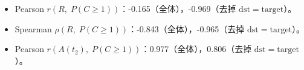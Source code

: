 \begin{itemize}
  \item Pearson $r(R,\;P(C\ge1))$：-0.165（全体），-0.969（去掉 $\mathrm{dst}=\mathrm{target}$）。
  \item Spearman $\rho(R,\;P(C\ge1))$：-0.843（全体），-0.965（去掉 $\mathrm{dst}=\mathrm{target}$）。
  \item Pearson $r(A(t_2),\;P(C\ge1))$：0.977（全体），0.806（去掉 $\mathrm{dst}=\mathrm{target}$）。
\end{itemize}

